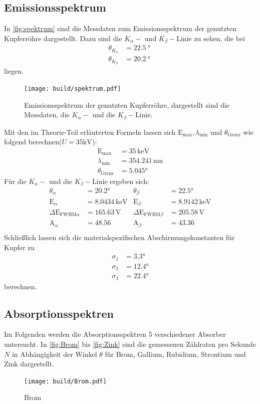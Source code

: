 \subsection{Emissionsspektrum}
In \autoref{fig:spektrum} sind die Messdaten zum Emissionsspektrum der genutzten Kupferröhre dargestellt. Dazu sind die $K_\alpha-$ und $K_\beta-$Linie zu sehen, die bei
\begin{align*}
    \theta_{K_\alpha} &= \SI{22.5}{\degree} \\
    \theta_{K_\beta}  &= \SI{20.2}{\degree} \; 
\end{align*}
liegen.
\begin{figure}[H]
  \centering
  \texttt{[image: build/spektrum.pdf]}
  \caption{Emissionsspektrum der genutzten Kupferröhre, dargestellt sind die Messdaten, die $K_\alpha-$ und die $K_\beta-$Linie.}
  \label{fig:spektrum}
\end{figure}
\noindent
Mit den im Theorie-Teil erläuterten Formeln lassen sich $\text{E}_\text{max}, \lambda_\text{min}$ und $\theta_\text{Grenz}$ wie folgend berechnen($U=35 \si{\kilo\volt}$):
\begin{align*}
  \text{E}_\text{max} &= 35 \, \mathrm{keV}\\
  \lambda_\text{min} &= 354.241 \, \mathrm{nm}\\
  \theta_\text{Grenz} &= 5.045°
\end{align*}
Für die $K_\alpha-$ und die $K_\beta-$Linie ergeben sich:
\begin{align*}
  \theta_\alpha&=20.2° & \theta_\beta&=22.5° \\
  \text{E}_\alpha&=8.0434 \, \mathrm{keV}   &\text{E}_\beta&=8.9142 \, \mathrm{keV} \\
  \Delta\text{E}_{\text{FWHM}\alpha}&=165.63 \, \mathrm{V}   &\Delta\text{E}_{\text{FWHM}\beta}&=205.58 \, \mathrm{V} \\
  \text{A}_\alpha&=48.56  &\text{A}_\beta&=43.36 \\
  \end{align*}
\noindent
Schließlich lassen sich die materialspezifischen Abschirmungskonstanten für Kupfer zu 
\begin{align*}
  \sigma_1 &= 3.3° \\
  \sigma_2 &= 12.4°\\
  \sigma_3 &= 22.4°
\end{align*}
berechnen.

\subsection{Absorptionsspektren}
Im Folgenden werden die Absorptionsspektren 5 verschiedener Absorber untersucht. In \autoref{fig:Brom} bis \autoref{fig:Zink} sind die gemessenen Zählraten pro Sekunde $N$ in Abhängigkeit der Winkel $\theta$ für Brom, Gallium, Rubidium, Strontium und Zink dargestellt. 
\begin{figure}[H]
  \centering
  \texttt{[image: build/Brom.pdf]}
  \caption{Brom}
  \label{fig:Brom}
\end{figure}

